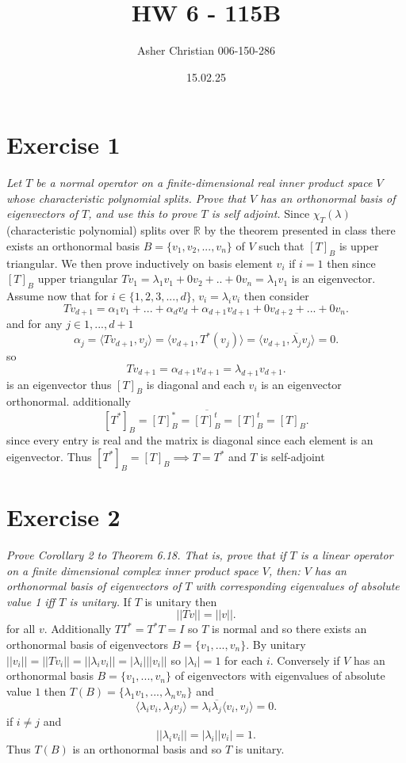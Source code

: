 \documentclass{article}
\title{HW 6 - 115B}
\author{Asher Christian 006-150-286}
\date{ 15.02.25}
\begin{document}
    \maketitle
    \section{Exercise 1}
    \emph{
        Let $T$ be a normal operator on a finite-dimensional real inner product space $V$ 
        whose characteristic polynomial splits. Prove that $V$ has an orthonormal basis
        of eigenvectors of $T$, and use this to prove $T$ is self adjoint.
    }
    Since $\chi_T(\lambda)$ (characteristic polynomial) splits over $ \mathbb{R}$ by the theorem presented
    in class there exists an orthonormal basis $B = \{v_1,v_2,...,v_n\}$ of $V$ such that
    $[T]_B$ is upper triangular. We then prove inductively on basis element $v_i$
    if $i=1$ then since $[T]_B$ upper triangular  $Tv_1 = \lambda_1 v_1 + 0v_2 + .. + 0v_n = \lambda_1 v_1$ is an eigenvector.
    Assume now that for $i \in\{1,2,3,...,d\}$,  $v_i = \lambda_i v_i$ then consider 
    \[
        Tv_{d+1} = \alpha_1 v_1 + ... + \alpha_{d}v_{d} + \alpha_{d+1}v_{d+1} + 0v_{d+2} + ... + 0 v_{n}
    .\] 
    and for any $j \in {1,...,d+1}$
    \[
        \alpha_j = \langle Tv_{d+1},v_j \rangle = \langle v_{d+1}, T^{*}(v_j) \rangle = \langle v_{d+1},\overline{\lambda_j}v_j \rangle = 0
    .\] 
    so
    \[
        Tv_{d+1} = \alpha_{d+1}v_{d+1} = \lambda_{d+1}v_{d+1}
    .\] 
    is an eigenvector thus $[T]_B$ is diagonal and each $v_i$ is an eigenvector orthonormal.
    additionally
    \[
        [T^{*}]_B = [T]_B^{*} = \overline{[T]_B^{t}} = [T]_B^{t} = [T]_B
    .\] 
    since every entry is real and the matrix is diagonal since each element is an eigenvector. Thus $[T^{*}]_B = [T]_B \implies T = T^{*}$ 
    and $T$ is self-adjoint

    \section{Exercise 2}
    \emph{
        Prove Corollary 2 to Theorem 6.18. That is, prove that if $T$ is a linear operator on a 
        finite dimensional complex inner product space $V$, then: $V$ has an orthonormal basis
        of eigenvectors of $T$ with corresponding eigenvalues of absolute value 1 iff $T$ 
        is unitary.
    }
    If $T$ is unitary then
    \[
    ||Tv|| = ||v||
    .\] for all $v$. Additionally $TT^{*} = T^{*}T = I$ so $T$ is normal and so there exists
    an orthonormal basis of eigenvectors $B = \{v_1,...,v_n\}$. By unitary $||v_i|| = ||Tv_i|| = ||\lambda_i v_i|| = |\lambda_i|||v_i||$ so
    $| \lambda_i| = 1$ for each $i$. Conversely if $V$ has an orthonormal basis $B = \{v_1,...,v_n\}$ of eigenvectors with eigenvalues of absolute value $1$ then
    $T(B) = \{\lambda_1v_1, ..., \lambda_nv_n\}$ and
    \[
    \langle \lambda_i v_i, \lambda_j v_j \rangle = \lambda_i \overline{\lambda_j} \langle v_i, v_j \rangle = 0
    .\] 
    if $i \ne j$ and
     \[
    ||\lambda_iv_i|| = |\lambda_i||v_i| = 1
    .\] 
    Thus $T(B)$ is an orthonormal basis and so $T$ is unitary.
\end{document}
